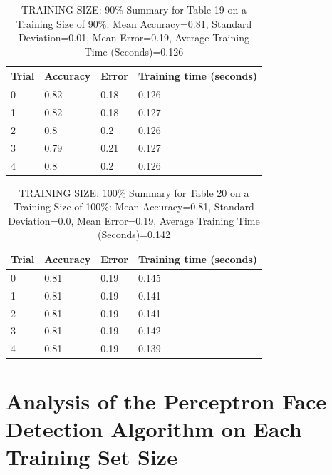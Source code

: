 \documentclass{article}
\begin{document}
\begin{table}[H]

\centering
{\begin{tabular}{||p{1cm}|p{1.8cm}|p{1.8cm}|p{3cm}||}
 \hline
Trial & Accuracy & Error & Training time (seconds) \\ [0.5ex] 
 \hline\hline
   0  & 0.82  & 0.18  & 0.126\\
\hline
   1  & 0.82  & 0.18  & 0.127\\
\hline
   2  & 0.8  & 0.2  & 0.126\\
\hline
   3  & 0.79  & 0.21  & 0.127\\
\hline
   4  & 0.8  & 0.2  & 0.126\\
\hline

\end{tabular}}
\caption{TRAINING SIZE: 90\% \newline Summary for Table 19 on a Training Size of 90\%: Mean Accuracy=0.81, Standard Deviation=0.01, Mean Error=0.19, Average Training Time (Seconds)=0.126}
\end{table} 

\begin{table}[H]

\centering
{\begin{tabular}{||p{1cm}|p{1.8cm}|p{1.8cm}|p{3cm}||}
 \hline
Trial & Accuracy & Error & Training time (seconds) \\ [0.5ex] 
 \hline\hline
   0  & 0.81  & 0.19  & 0.145\\
\hline
   1  & 0.81  & 0.19  & 0.141\\
\hline
   2  & 0.81  & 0.19  & 0.141\\
\hline
   3  & 0.81  & 0.19  & 0.142\\
\hline
   4  & 0.81  & 0.19  & 0.139\\
\hline

\end{tabular}}
\caption{TRAINING SIZE: 100\% \newline Summary for Table 20 on a Training Size of 100\%: Mean Accuracy=0.81, Standard Deviation=0.0, Mean Error=0.19, Average Training Time (Seconds)=0.142}
\end{table} 


\section{Analysis of the Perceptron Face Detection Algorithm on Each Training Set Size}
\end{document}
